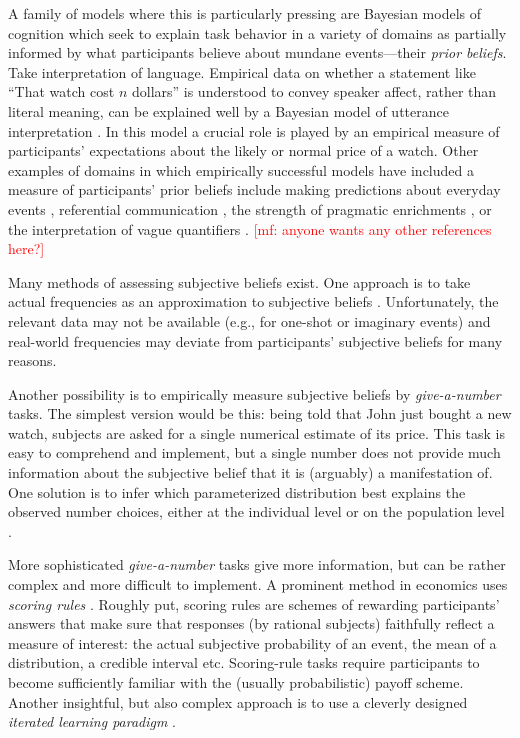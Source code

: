 \documentclass[10pt,letterpaper]{article}
\newcommand{\mf}[1]{\textcolor{Red}{[mf: #1]}}
\newcommand{\citep}[1]{\cite{#1}}
\begin{document}
A family of models where this is particularly pressing are Bayesian models of cognition which
seek to explain task behavior in a variety of domains as partially informed by what
participants believe about mundane events---their \emph{prior beliefs}. Take interpretation of
language. Empirical data on whether a statement like ``That watch cost $n$ dollars'' is
understood to convey speaker affect, rather than literal meaning, can be explained well by a
Bayesian model of utterance interpretation \citep{KaoWu2014:Nonliteral-Unde}. In this model a
crucial role is played by an empirical measure of participants' expectations about the likely
or normal price of a watch.  Other examples of domains in which empirically successful models
have included a measure of participants' prior beliefs include making predictions about
everyday events \citep{GriffithsTenenbaum2006:Optimal-Predict}, referential communication
\citep{FrankGoodman2012:Predicting-Prag}, the strength of pragmatic enrichments
\citep{DegenTessler2015:Wonky-worlds:-L}, or the interpretation of vague quantifiers
\citep{SchollerFranke2015:Semantic-values}. \mf{anyone wants any other references here?}

Many methods of assessing subjective beliefs exist. One approach is to take actual frequencies
as an approximation to subjective beliefs
\citep{GriffithsTenenbaum2006:Optimal-Predict}. Unfortunately, the relevant data may not be
available (e.g., for one-shot or imaginary events) and real-world frequencies may deviate from
participants' subjective beliefs for many reasons.

Another possibility is to empirically measure subjective beliefs by \emph{give-a-number}
tasks. The simplest version would be this: being told that John just bought a new watch,
subjects are asked for a single numerical estimate of its price. This task is easy to
comprehend and implement, but a single number does not provide much information about the
subjective belief that it is (arguably) a manifestation of. One solution is to infer which
parameterized distribution best explains the observed number choices, either at the individual
level \citep{Manski2004:Measuring-Expec} or on the population level
\citep{TauberSteyvers2013:Inferring-Subje}.

More sophisticated \emph{give-a-number} tasks give more information, but can be rather complex
and more difficult to implement. A prominent method in economics uses \emph{scoring rules}
\citep{Savage1971:Elicitation-of-,AndersenFountain2014:Estimating-Subj,SchlagTremewan2014:A-penny-for-you}. Roughly
put, scoring rules are schemes of rewarding participants' answers that make sure that responses
(by rational subjects) faithfully reflect a measure of interest: the actual subjective
probability of an event, the mean of a distribution, a credible interval etc. Scoring-rule
tasks require participants to become sufficiently familiar with the (usually probabilistic)
payoff scheme. Another insightful, but also complex approach is to use a cleverly designed
\emph{iterated learning paradigm} \citep{LewandowskyGriffiths2009:The-Wisdom-of-I}.
\end{document}
